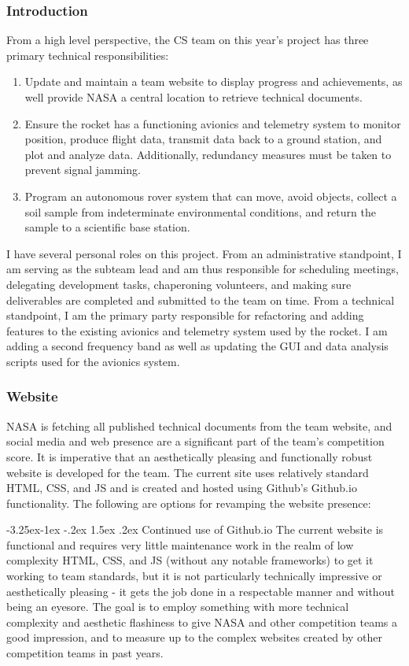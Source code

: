 \documentclass[onecolumn, draftclsnofoot, 10pt, compsoc]{IEEEtran}
\makeatletter
\renewcommand\paragraph{\@startsection{paragraph}{4}{\z@}%
                                     {-3.25ex\@plus -1ex \@minus -.2ex}%
                                     {1.5ex \@plus .2ex}%
                                     {\normalfont\normalsize\bfseries}}
\makeatother
\begin{document}
\subsubsection{Introduction}
From a high level perspective, the CS team on this year's project has three primary technical responsibilities:\medskip
\begin{enumerate}
    \item Update and maintain a team website to display progress and achievements, as well provide NASA a central location to retrieve technical documents.
    \item Ensure the rocket has a functioning avionics and telemetry system to monitor position, produce flight data, transmit data back to a ground station, and plot and analyze data. Additionally, redundancy measures must be taken to prevent signal jamming.
    \item Program an autonomous rover system that can move, avoid objects, collect a soil sample from indeterminate environmental conditions, and return the sample to a scientific base station.
\end{enumerate}
I have several personal roles on this project. From an administrative standpoint, I am serving as the subteam lead and am thus responsible for scheduling meetings, delegating development tasks, chaperoning volunteers, and making sure deliverables are completed and submitted to the team on time. From a technical standpoint, I am the primary party responsible for refactoring and adding features to the existing avionics and telemetry system used by the rocket. I am adding a second frequency band as well as updating the GUI and data analysis scripts used for the avionics system.

\subsubsection{Website}
NASA is fetching all published technical documents from the team website, and social media and web presence are a significant part of the team's competition score. It is imperative that an aesthetically pleasing and functionally robust website is developed for the team. The current site uses relatively standard HTML, CSS, and JS and is created and hosted using Github's Github.io functionality. The following are options for revamping the website presence:

\paragraph{Continued use of Github.io}
The current website is functional and requires very little maintenance work in the realm of low complexity HTML, CSS, and JS (without any notable frameworks) to get it working to team standards, but it is not particularly technically impressive or aesthetically pleasing - it gets the job done in a respectable manner and without being an eyesore. The goal is to employ something with more technical complexity and aesthetic flashiness to give NASA and other competition teams a good impression, and to measure up to the complex websites created by other competition teams in past years.
\end{document}
